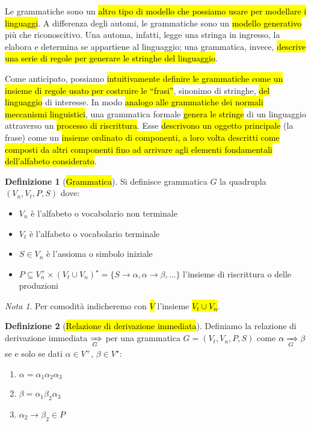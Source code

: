 \documentclass[a4paper,11pt,oneside]{article}
\theoremstyle{plain}
\theoremstyle{definition}
\newtheorem{defn}{Definizione}[section]
\theoremstyle{remark}
\newtheorem*{nota}{Nota}
\newcommand*{\deriv}[1][]{\xRightarrow[#1]{}}
\begin{document}
Le grammatiche sono un \hl{altro tipo di modello che possiamo usare per
modellare i linguaggi}. A differenza degli automi, le grammatiche sono un
\hl{modello generativo} più che riconoscitivo. Una automa, infatti, legge una
stringa in ingresso, la elabora e determina se appartiene al linguaggio; una
grammatica, invece, \hl{descrive una serie di regole per generare le stringhe
del linguaggio}.

Come anticipato, possiamo \hl{intuitivamente definire le grammatiche come un
insieme di regole usato per costruire le ``frasi''}, sinonimo di stringhe,
\hl{del linguaggio} di interesse. In modo \hl{analogo alle grammatiche dei
normali meccanismi linguistici}, una grammatica formale \hl{genera le stringe}
di un linguaggio attraverso un \hl{processo di riscrittura}. Esse \hl{descrivono
un oggetto principale} (la frase) come un \hl{insieme ordinato di componenti, a
loro volta descritti come composti da altri componenti fino ad arrivare agli
elementi fondamentali dell'alfabeto considerato}.

\begin{defn}[\hl{Grammatica}]\label{def:grammatica}
  Si definisce grammatica $G$ la quadrupla $(V_n, V_t, P, S)$ dove:

  \begin{itemize}
    \item $V_n$ è l'alfabeto o vocabolario non terminale
    \item $V_t$ è l'alfabeto o vocabolario terminale
    \item $S \in V_n$ è l'assioma o simbolo iniziale
    \item
      $P \subseteq V_n^+ \times {(V_t \cup V_n)}^\star =
      \{S \to \alpha, \alpha \to \beta, \ldots\}$ l'insieme di riscrittura o
      delle produzioni
  \end{itemize}
\end{defn}

\begin{nota}
  Per comodità indicheremo con \hl{$V$} l'insieme \hl{$V_t \cup V_n$}.
\end{nota}

\begin{defn}[\hl{Relazione di derivazione immediata}]\label{def:deriv}
  Definiamo la relazione di derivazione immediata $\deriv[G]$ per una grammatica
  $G = (V_t, V_n, P, S)$ come $\alpha \deriv[G] \beta$ se e solo se dati
  $\alpha \in V^+$, $\beta \in V^\star$:

  \begin{enumerate}
    \item $\alpha = \alpha_1 \alpha_2 \alpha_3$
    \item $\beta = \alpha_1 \beta_2 \alpha_3$
    \item $\alpha_2 \to \beta_2 \in P$
  \end{enumerate}
\end{defn}
\end{document}
